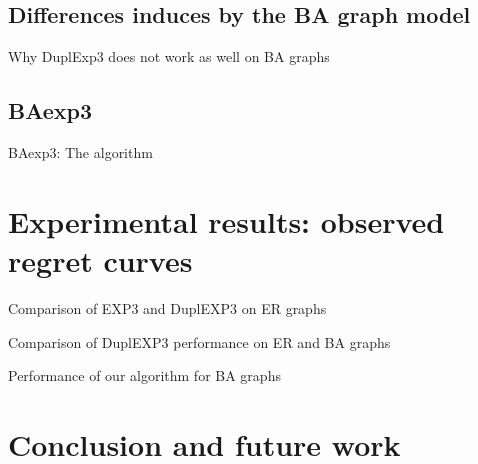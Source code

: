 \documentclass[11pt,xcolor={dvipsnames}]{beamer}
\begin{document}
\subsection{Differences induces by the BA graph model}
\begin{frame}{Why DuplExp3 does not work as well on BA graphs}
\end{frame}

\subsection{BAexp3}
\begin{frame}{BAexp3: The algorithm}
\end{frame}


\section{Experimental results: observed regret curves}
\begin{frame}{Comparison of EXP3 and DuplEXP3 on ER graphs}
\end{frame}

\begin{frame}{Comparison of DuplEXP3 performance on ER and BA graphs}
\end{frame}

\begin{frame}{Performance of our algorithm for BA graphs}
\end{frame}

\section{Conclusion and future work}
\end{document}
